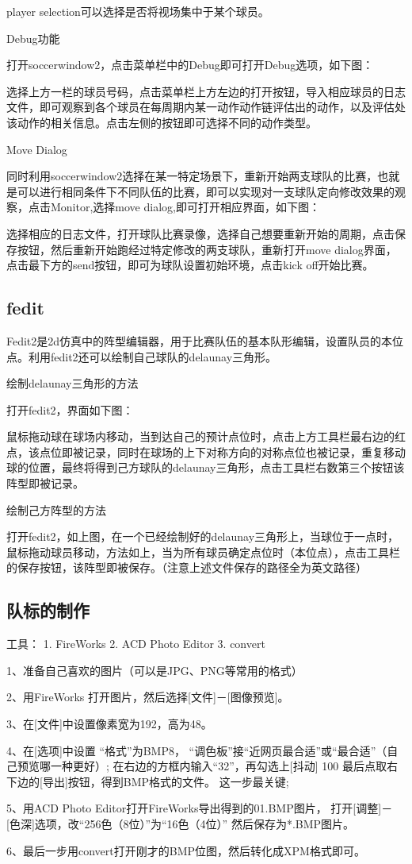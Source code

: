 player selection可以选择是否将视场集中于某个球员。



Debug功能

打开soccerwindow2，点击菜单栏中的Debug即可打开Debug选项，如下图：



选择上方一栏的球员号码，点击菜单栏上方左边的打开按钮，导入相应球员的日志文件，即可观察到各个球员在每周期内某一动作动作链评估出的动作，以及评估处该动作的相关信息。点击左侧的按钮即可选择不同的动作类型。

Move Dialog

同时利用soccerwindow2选择在某一特定场景下，重新开始两支球队的比赛，也就是可以进行相同条件下不同队伍的比赛，即可以实现对一支球队定向修改效果的观察，点击Monitor,选择move dialog,即可打开相应界面，如下图：



选择相应的日志文件，打开球队比赛录像，选择自己想要重新开始的周期，点击保存按钮，然后重新开始跑经过特定修改的两支球队，重新打开move dialog界面，点击最下方的send按钮，即可为球队设置初始环境，点击kick off开始比赛。


\subsection{fedit}

Fedit2是2d仿真中的阵型编辑器，用于比赛队伍的基本队形编辑，设置队员的本位点。利用fedit2还可以绘制自己球队的delaunay三角形。

绘制delaunay三角形的方法

打开fedit2，界面如下图：



鼠标拖动球在球场内移动，当到达自己的预计点位时，点击上方工具栏最右边的红点，该点位即被记录，同时在球场的上下对称方向的对称点位也被记录，重复移动球的位置，最终将得到己方球队的delaunay三角形，点击工具栏右数第三个按钮该阵型即被记录。

绘制己方阵型的方法

打开fedit2，如上图，在一个已经绘制好的delaunay三角形上，当球位于一点时，鼠标拖动球员移动，方法如上，当为所有球员确定点位时（本位点），点击工具栏的保存按钮，该阵型即被保存。（注意上述文件保存的路径全为英文路径）

\subsection{队标的制作}
工具：
1. FireWorks  
2. ACD Photo Editor 
3. convert 

1、准备自己喜欢的图片（可以是JPG、PNG等常用的格式） 

2、用FireWorks 打开图片，然后选择[文件]－[图像预览]。 

3、在[文件]中设置像素宽为192，高为48。 

4、在[选项]中设置 “格式”为BMP8， 
“调色板”接“近网页最合适”或“最合适”（自己预览哪一种更好）; 
在右边的方框内输入“32”，再勾选上[抖动] 100%
最后点取右下边的[导出]按钮，得到BMP格式的文件。 这一步最关键; 

5、用ACD Photo Editor打开FireWorks导出得到的01.BMP图片， 
打开[调整]－[色深]选项，改“256色（8位）”为“16色（4位）” 
然后保存为*.BMP图片。 

6、最后一步用convert打开刚才的BMP位图，然后转化成XPM格式即可。   
